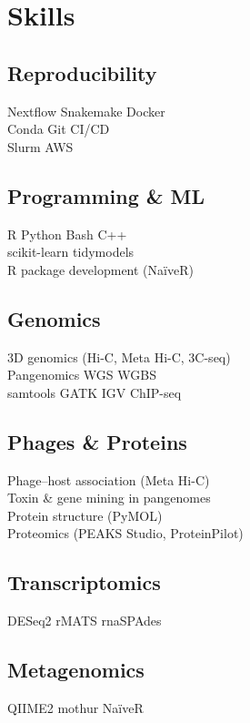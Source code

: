 \documentclass[]{deedy-resume-openfont}
\begin{document}
\begin{minipage}[t]{0.33\textwidth}

\section{Skills}
\subsection{Reproducibility}
Nextflow \textbullet{} Snakemake \textbullet{} Docker \\
Conda \textbullet{} Git \textbullet{} CI/CD \\
Slurm \textbullet{} AWS
\sectionsep

\subsection{Programming \& ML}
R \textbullet{} Python \textbullet{} Bash \textbullet{} C++ \\
scikit-learn \textbullet{} tidymodels \\
R package development (NaïveR)
\sectionsep

\subsection{Genomics}
3D genomics (Hi-C, Meta Hi-C, 3C-seq) \\
Pangenomics \textbullet{} WGS \textbullet{} WGBS \\
samtools \textbullet{} GATK \textbullet{} IGV \textbullet{} ChIP-seq
\sectionsep

\subsection{Phages \& Proteins}
Phage--host association (Meta Hi-C) \\
Toxin \& gene mining in pangenomes \\
Protein structure (PyMOL) \\
Proteomics (PEAKS Studio, ProteinPilot)
\sectionsep

\subsection{Transcriptomics}
DESeq2 \textbullet{} rMATS \textbullet{} rnaSPAdes
\sectionsep

\subsection{Metagenomics}
QIIME2 \textbullet{} mothur \textbullet{} NaïveR
\sectionsep


\end{minipage}
\end{document}
